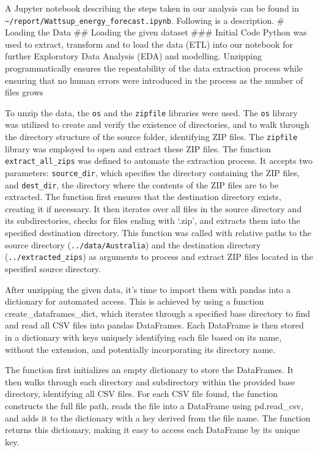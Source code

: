 \documentclass[
]{article}
\begin{document}
A Jupyter notebook describing the steps taken in our analysis can be
found in
\texttt{\textasciitilde{}/report/Wattsup\_energy\_forecast.ipynb}.
Following is a description. \# Loading the Data \#\# Loading the given
dataset \#\#\# Initial Code Python was used to extract, transform and to
load the data (ETL) into our notebook for further Exploratory Data
Analysis (EDA) and modelling. Unzipping programmatically ensures the
repeatability of the data extraction process while ensuring that no
human errors were introduced in the process as the number of files grows

To unzip the data, the \texttt{os} and the \texttt{zipfile} libraries
were used. The \texttt{os} library was utilized to create and verify the
existence of directories, and to walk through the directory structure of
the source folder, identifying ZIP files. The \texttt{zipfile} library
was employed to open and extract these ZIP files. The function
\texttt{extract\_all\_zips} was defined to automate the extraction
process. It accepts two parameters: \texttt{source\_dir}, which
specifies the directory containing the ZIP files, and
\texttt{dest\_dir}, the directory where the contents of the ZIP files
are to be extracted. The function first ensures that the destination
directory exists, creating it if necessary. It then iterates over all
files in the source directory and its subdirectories, checks for files
ending with `.zip', and extracts them into the specified destination
directory. This function was called with relative paths to the source
directory
(\texttt{\textquotesingle{}../data/Australia\textquotesingle{}}) and the
destination directory
(\texttt{\textquotesingle{}../extracted\_zips\textquotesingle{}}) as
arguments to process and extract ZIP files located in the specified
source directory.

After unzipping the given data, it's time to import them with pandas
into a dictionary for automated access. This is achieved by using a
function create\_dataframes\_dict, which iterates through a specified
base directory to find and read all CSV files into pandas DataFrames.
Each DataFrame is then stored in a dictionary with keys uniquely
identifying each file based on its name, without the extension, and
potentially incorporating its directory name.

The function first initializes an empty dictionary to store the
DataFrames. It then walks through each directory and subdirectory within
the provided base directory, identifying all CSV files. For each CSV
file found, the function constructs the full file path, reads the file
into a DataFrame using pd.read\_csv, and adds it to the dictionary with
a key derived from the file name. The function returns this dictionary,
making it easy to access each DataFrame by its unique key.
\end{document}
